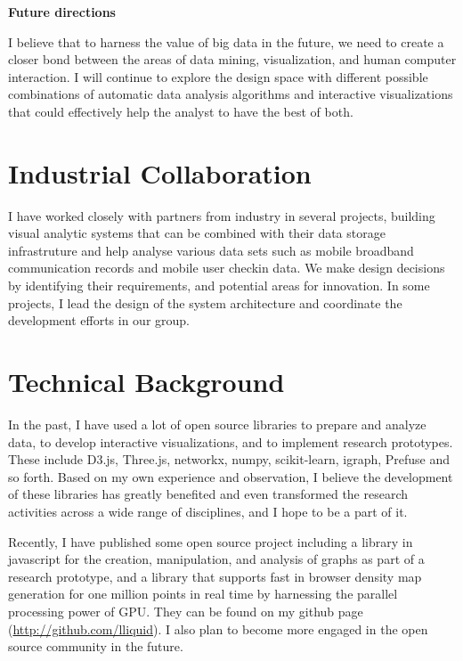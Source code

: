 \documentclass[11pt,a4paper,sans]{moderncv} %
\begin{document}
\textbf{Future directions}

I believe that to harness the value of big data in the future, we need to create a closer bond between the areas of data mining, visualization, and human computer interaction. I will continue to explore the design space with different possible combinations of automatic data analysis algorithms and interactive visualizations that could effectively help the analyst to have the best of both.

\clearpage

\section{Industrial Collaboration}

I have worked closely with partners from industry in several projects, building visual analytic systems that can be combined with their data storage infrastruture and help analyse various data sets such as mobile broadband communication records and mobile user checkin data. We make design decisions by identifying their requirements, and potential areas for innovation. In some projects, I lead the design of the system architecture and coordinate the development efforts in our group.

\section{Technical Background}

In the past, I have used a lot of open source libraries to prepare and analyze data, to develop interactive visualizations, and to implement research prototypes. These include D3.js, Three.js, networkx, numpy, scikit-learn, igraph, Prefuse and so forth. Based on my own experience and observation, I believe the development of these libraries has greatly benefited and even transformed the research activities across a wide range of disciplines, and I hope to be a part of it.

Recently, I have published some open source project including a library in javascript for the creation, manipulation, and analysis of graphs as part of a research prototype, and a library that supports fast in browser density map generation for one million points in real time by harnessing the parallel processing power of GPU. They can be found on my github page (\href{http://github.com/lliquid}{http://github.com/lliquid}). I also plan to become more engaged in the open source community in the future.
\end{document}
